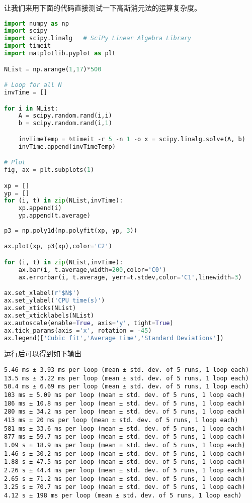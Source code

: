 让我们来用下面的代码直接测试一下高斯消元法的运算复杂度。
\begin{lstlisting}[language=python]
import numpy as np
import scipy
import scipy.linalg   # SciPy Linear Algebra Library
import timeit
import matplotlib.pyplot as plt

NList = np.arange(1,17)*500

# Loop for all N
invTime = []

for i in NList:
    A = scipy.random.rand(i,i)
    b = scipy.random.rand(i,1)

    invTimeTemp = %timeit -r 5 -n 1 -o x = scipy.linalg.solve(A, b)
    invTime.append(invTimeTemp)

# Plot
fig, ax = plt.subplots(1)

xp = []
yp = []
for (i, t) in zip(NList,invTime):
    xp.append(i)
    yp.append(t.average)
    
p3 = np.poly1d(np.polyfit(xp, yp, 3))

ax.plot(xp, p3(xp),color='C2')

for (i, t) in zip(NList,invTime):
    ax.bar(i, t.average,width=200,color='C0')
    ax.errorbar(i, t.average, yerr=t.stdev,color='C1',linewidth=3)

ax.set_xlabel(r'$N$')
ax.set_ylabel('CPU time(s)')
ax.set_xticks(NList)
ax.set_xticklabels(NList)
ax.autoscale(enable=True, axis='y', tight=True)
ax.tick_params(axis ='x', rotation = -45) 
ax.legend(['Cubic fit','Average time','Standard Deviations'])
\end{lstlisting}

运行后可以得到如下输出

\begin{lstlisting}[language={}]
5.46 ms ± 3.93 ms per loop (mean ± std. dev. of 5 runs, 1 loop each)
13.5 ms ± 3.22 ms per loop (mean ± std. dev. of 5 runs, 1 loop each)
50.4 ms ± 6.69 ms per loop (mean ± std. dev. of 5 runs, 1 loop each)
103 ms ± 5.09 ms per loop (mean ± std. dev. of 5 runs, 1 loop each)
186 ms ± 10.8 ms per loop (mean ± std. dev. of 5 runs, 1 loop each)
280 ms ± 34.2 ms per loop (mean ± std. dev. of 5 runs, 1 loop each)
413 ms ± 20 ms per loop (mean ± std. dev. of 5 runs, 1 loop each)
581 ms ± 33.6 ms per loop (mean ± std. dev. of 5 runs, 1 loop each)
877 ms ± 59.7 ms per loop (mean ± std. dev. of 5 runs, 1 loop each)
1.09 s ± 18.9 ms per loop (mean ± std. dev. of 5 runs, 1 loop each)
1.46 s ± 30.2 ms per loop (mean ± std. dev. of 5 runs, 1 loop each)
1.88 s ± 47.5 ms per loop (mean ± std. dev. of 5 runs, 1 loop each)
2.26 s ± 44.4 ms per loop (mean ± std. dev. of 5 runs, 1 loop each)
2.65 s ± 71.2 ms per loop (mean ± std. dev. of 5 runs, 1 loop each)
3.25 s ± 70.7 ms per loop (mean ± std. dev. of 5 runs, 1 loop each)
4.12 s ± 198 ms per loop (mean ± std. dev. of 5 runs, 1 loop each)
\end{lstlisting}

